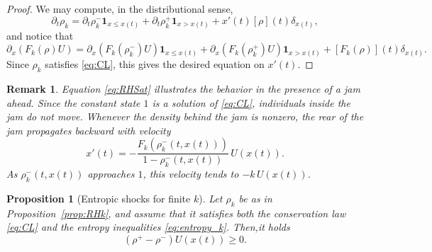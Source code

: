 \documentclass[11pt,twoside]{article}
\numberwithin{equation}{section}
\newcommand {\p}   {\partial}
\newtheorem{remark}[theorem]{Remark}
\newtheorem{proposition}[theorem]{Proposition}
\begin{document}
\begin{proof}
    We may compute, in the distributional sense, 
    \[
    \p_t\rho_k = \p_t\rho_k^- \mathbf{1}_{x\le x(t)} +\p_t\rho_k^+\mathbf{1}_{x>x(t)} + x'(t)[\rho](t)\delta_{x(t)},
    \]
    and notice that
    \[
    \p_x(F_k(\rho)U) = \p_x(F_k(\rho_k^-)U)\mathbf{1}_{x \le x(t)} + \p_x(F_k(\rho_k^+)U)\mathbf{1}_{x >x(t)} + [F_k(\rho)](t)\delta_{x(t)}.
    \]
    Since $\rho_k$ satisfies \eqref{eq:CL}, this gives the desired equation on $x'(t)$.
\end{proof}

\begin{remark}
Equation \eqref{eq:RHSat} illustrates the behavior in the presence of a jam ahead. Since the constant state $1$ is a solution of \eqref{eq:CL}, individuals inside the jam do not move. Whenever the density behind the jam is nonzero, the rear of the jam propagates backward with velocity
\[
x'(t) = -\frac{F_k(\rho_k^-(t,x(t)))}{1-\rho_k^-(t,x(t))}\,U(x(t)).
\]
As $\rho_k^-(t,x(t))$ approaches $1$, this velocity tends to $-k\,U(x(t))$.
\end{remark}

\begin{proposition}[Entropic shocks for finite $k$]
\label{thm:entropic_shocks_k}
Let $\rho_k$ be as in Proposition~\ref{prop:RHk}, and assume that it satisfies both the conservation law \eqref{eq:CL} and the entropy inequalities \eqref{eq:entropy_k}. Then,it holds
\[
(\rho^+ - \rho^-)U(x(t)) \ge 0.
\]
\end{proposition}
\end{document}
